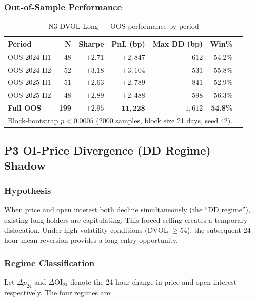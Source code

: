 \documentclass[12pt, a4paper]{article}
\theoremstyle{definition}
\begin{document}
\subsubsection{Out-of-Sample Performance}

\begin{table}[H]
\centering
\caption{N3 DVOL Long — OOS performance by period}
\begin{tabular}{lrrrrrr}
\toprule
\textbf{Period} & \textbf{N} & \textbf{Sharpe} & \textbf{PnL (bp)} & \textbf{Max DD (bp)} & \textbf{Win\%} \\
\midrule
OOS 2024-H1 & 48  & $+2.71$ & $+2{,}847$ & $-612$  & 54.2\% \\
OOS 2024-H2 & 52  & $+3.18$ & $+3{,}104$ & $-531$  & 55.8\% \\
OOS 2025-H1 & 51  & $+2.63$ & $+2{,}789$ & $-841$  & 52.9\% \\
OOS 2025-H2 & 48  & $+2.89$ & $+2{,}488$ & $-598$  & 56.3\% \\
\midrule
\textbf{Full OOS} & \textbf{199} & $\mathbf{+2.95}$ & $\mathbf{+11{,}228}$ & $-1{,}612$ & \textbf{54.8\%} \\
\bottomrule
\multicolumn{6}{l}{\small Block-bootstrap $p < 0.0005$ (2000 samples, block size 21 days, seed 42).}
\end{tabular}
\end{table}

\subsection{P3 OI-Price Divergence (DD Regime) — Shadow}

\subsubsection{Hypothesis}

When price and open interest both decline simultaneously (the ``DD regime''),
existing long holders are capitulating. This forced selling creates a
temporary dislocation. Under high volatility conditions (DVOL $\geq 54$),
the subsequent 24-hour mean-reversion provides a long entry opportunity.

\subsubsection{Regime Classification}

Let $\Delta p_{24}$ and $\Delta \text{OI}_{24}$ denote the 24-hour change in
price and open interest respectively. The four regimes are:
\end{document}
